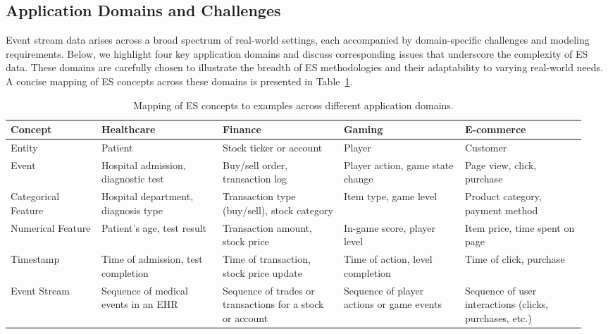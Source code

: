 \documentclass[twoside,11pt]{article}
\begin{document}
\subsection{Application Domains and Challenges}
\label{subsec:application-domains}
Event stream data arises across a broad spectrum of real-world settings, each accompanied by domain-specific challenges and modeling requirements. Below, we highlight four key application domains and discuss corresponding issues that underscore the complexity of ES data. These domains are carefully chosen to illustrate the breadth of ES methodologies and their adaptability to varying real-world needs. A concise mapping of ES concepts across these domains is presented in Table~\ref{tab:notation}.

\begin{table}[ht!]
    \centering
    \footnotesize
    \renewcommand{\arraystretch}{1.5} %
    \setlength{\tabcolsep}{2pt} %
    \begin{tabular}{>{\centering\arraybackslash}p{0.15\linewidth}|
                        >{\centering\arraybackslash}p{0.2\linewidth}|
                        >{\centering\arraybackslash}p{0.2\linewidth}|
                        >{\centering\arraybackslash}p{0.2\linewidth}|
                        >{\centering\arraybackslash}p{0.2\linewidth}}
        \textbf{Concept} & \textbf{Healthcare} & \textbf{Finance} & \textbf{Gaming} & \textbf{E-commerce} \\ \hline
        Entity & Patient & Stock ticker or account & Player & Customer \\ \hline
        Event & Hospital admission, diagnostic test & Buy/sell order, transaction log & Player action, game state change & Page view, click, purchase \\ \hline
        Categorical Feature & Hospital department, diagnosis type & Transaction type (buy/sell), stock category & Item type, game level & Product category, payment method \\ \hline
        Numerical Feature & Patient's age, test result & Transaction amount, stock price & In-game score, player level & Item price, time spent on page \\ \hline
        Timestamp & Time of admission, test completion & Time of transaction, stock price update & Time of action, level completion & Time of click, purchase \\ \hline
        Event Stream & Sequence of medical events in an EHR & Sequence of trades or transactions for a stock or account & Sequence of player actions or game events & Sequence of user interactions (clicks, purchases, etc.)
    \end{tabular}
    \caption{Mapping of ES concepts to examples across different application domains.}
    \label{tab:notation}
\end{table}
\end{document}
